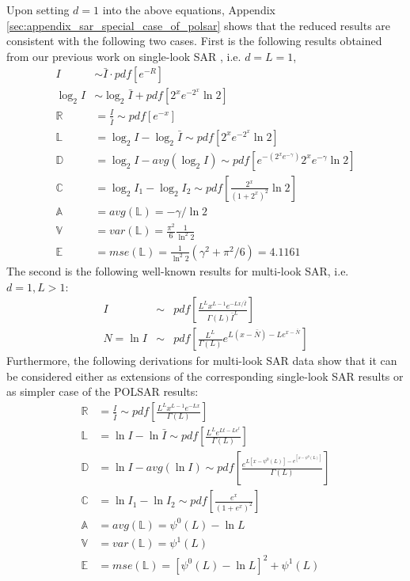 \documentclass[journal,12pt,draftcls,onecolumn]{IEEEtran}
\begin{document}
Upon setting $d=1$ into the above equations,
  Appendix \ref{sec:appendix_sar_special_case_of_polsar} shows that the reduced results are consistent with the following two cases.
First is the following results obtained from our previous work on single-look SAR \cite{Le_2010_ACRS} , i.e. $d=L=1$,
\begin{align*}
  I &\sim \bar{I} \cdot pdf \left[ e^{-R} \right] \\
  \log_2{I} &\sim \log_2{\bar{I}} + pdf \left[ 2^xe^{-2^x}\ln2 \right] \\
  \mathbb{R} &= \frac{I}{\bar{I}} \sim pdf \left[ e^{-x} \right]  \\
  \mathbb{L} &= \log_2{I} - \log_2{\bar{I}} \sim pdf \left[ 2^xe^{-2^x}\ln2 \right]\\
  \mathbb{D} &= \log_2{I} - avg(\log_2{I}) \sim pdf \left[ e^{-(2^xe^{-\gamma})} 2^xe^{-\gamma} \ln2 \right] \\
  \mathbb{C} &= \log_2{I_1} - \log_2{I_2} \sim pdf \left[ \frac{2^x}{(1+2^x)^2} \ln2 \right] \\
  \mathbb{A} &= avg(\mathbb{L}) = -\gamma / \ln{2} \\
  \mathbb{V} &= var(\mathbb{L}) = \frac{\pi^2}{6} \frac{1}{ \ln^2{2}} \\
  \mathbb{E} &= mse(\mathbb{L}) = \frac{1}{\ln^2{2}}( \gamma^2 + \pi^2/6 ) = 4.1161 
\end{align*}
The second is the following well-known results for multi-look SAR, i.e. $d=1,L>1$:
  \begin{eqnarray}
I &\sim& pdf \left[ \frac{L^L x^{L-1} e^{-Lx/\bar{I}}}{\Gamma(L) \bar{I}^L} \right] \\
N = \ln{I} &\sim& pdf \left[ \frac{L^L}{\Gamma(L)} e^{L(x-\bar{N})-Le^{x-\bar{N}}} \right]
  \end{eqnarray}
Furthermore, the following derivations for multi-look SAR data
   show that it can be considered 
    either as extensions of the corresponding single-look SAR results
    or as simpler case of the POLSAR results:
  \begin{align*}
    \mathbb{R} &= \frac{I}{\bar{I}} \sim pdf \left[ \frac{ L^{L} x^{L-1} e^{-Lx}}{ \Gamma(L)} \label{eqn:multi_look_SAR_ratio_dist} \right]\\
    \mathbb{L} &= \ln{I} - \ln{\bar{I}} \sim pdf \left[ \frac{L^Le^{Lt-Le^t}}{ \Gamma(L)}  \right] \\
    \mathbb{D} &= \ln{I} - avg(\ln{I}) \sim pdf \left[ \frac{e^{L[x-\psi^0(L)]-e^{[x-\psi^0(L)]}}}{\Gamma(L)} \right] \\
    \mathbb{C} &= \ln{I_1} - \ln{I_2} \sim pdf \left[ \frac{e^{x}}{(1+e^x)^{2}} \right] \\
    \mathbb{A} &= avg(\mathbb{L}) = \psi^0(L) - \ln{L} \\
    \mathbb{V} &= var(\mathbb{L}) = \psi^1(L) \\
    \mathbb{E} &= mse(\mathbb{L}) = \left[ \psi^0(L) - \ln{L} \right]^2 + \psi^1(L)
  \end{align*}
\end{document}

